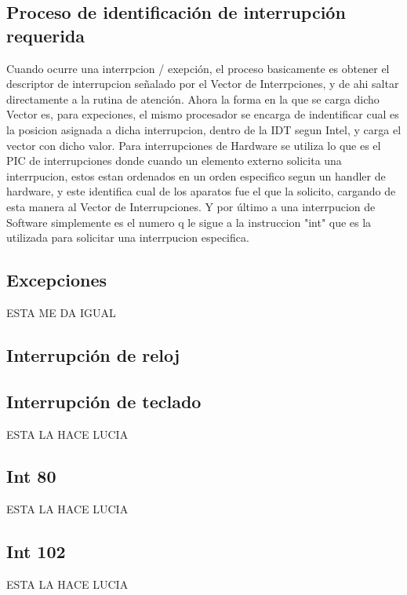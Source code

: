\subsection{Proceso de identificación de interrupción requerida}
\par{Cuando ocurre una interrpcion / exepción, el proceso basicamente es obtener el descriptor de interrupcion señalado por el Vector de Interrpciones, y de ahi saltar directamente a la rutina de atención. Ahora la forma en la que se carga dicho Vector es, para expeciones, el mismo procesador se encarga de indentificar cual es la posicion asignada a dicha interrupcion, dentro de la IDT segun Intel, y carga el vector con dicho valor.  Para interrupciones de Hardware se utiliza lo que es el PIC de interrupciones donde cuando un elemento externo solicita una interrpucion, estos estan ordenados en un orden especifico segun un handler de hardware, y este identifica cual de los aparatos fue el que la solicito, cargando de esta manera al Vector de Interrupciones. Y por último a una interrpucion de Software simplemente es el numero q le sigue a la instruccion "int" que es la utilizada para solicitar una interrpucion especifica.}

\subsection{Excepciones}
\par{ESTA ME DA IGUAL}
\subsection{Interrupción de reloj}
\subsection{Interrupción de teclado}
\par{ESTA LA HACE LUCIA}
\subsection{Int 80}
\par{ESTA LA HACE LUCIA}
\subsection{Int 102}
\par{ESTA LA HACE LUCIA}